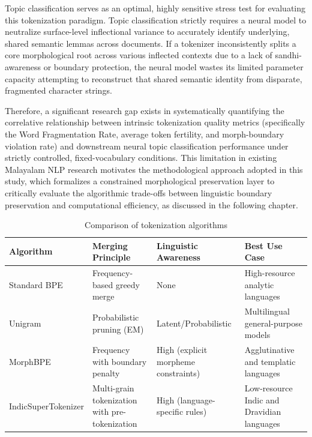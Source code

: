 \documentclass[12pt]{article}
\begin{document}
	Topic classification serves as an optimal, highly sensitive stress test for evaluating this tokenization paradigm. Topic classification strictly requires a neural model to neutralize surface-level inflectional variance to accurately identify underlying, shared semantic lemmas across documents. If a tokenizer inconsistently splits a core morphological root across various inflected contexts due to a lack of sandhi-awareness or boundary protection, the neural model wastes its limited parameter capacity attempting to reconstruct that shared semantic identity from disparate, fragmented character strings. 
	
	Therefore, a significant research gap exists in systematically quantifying the correlative relationship between intrinsic tokenization quality metrics (specifically the Word Fragmentation Rate, average token fertility, and morph-boundary violation rate) and downstream neural topic classification performance under strictly controlled, fixed-vocabulary conditions. This limitation in existing Malayalam NLP research motivates the methodological approach adopted in this study, which formalizes a constrained morphological preservation layer to critically evaluate the algorithmic trade-offs between linguistic boundary preservation and computational efficiency, as discussed in the following chapter. 
	
	
	\begin{table}[h]
		\centering
		\begin{tabularx}{\textwidth}{l X X X}
			\toprule
			\textbf{Algorithm} & \textbf{Merging Principle} & \textbf{Linguistic Awareness} & \textbf{Best Use Case} \\
			\midrule
			
			Standard BPE 
			& Frequency-based greedy merge 
			& None 
			& High-resource analytic languages \\
			
			Unigram 
			& Probabilistic pruning (EM) 
			& Latent/Probabilistic 
			& Multilingual general-purpose models \\
			
			MorphBPE 
			& Frequency with boundary penalty 
			& High (explicit morpheme constraints) 
			& Agglutinative and templatic languages \\
			
			IndicSuperTokenizer 
			& Multi-grain tokenization with pre-tokenization 
			& High (language-specific rules) 
			& Low-resource Indic and Dravidian languages \\
			
			\bottomrule
		\end{tabularx}
		\caption{Comparison of tokenization algorithms}
	\end{table}
	
\end{document}
